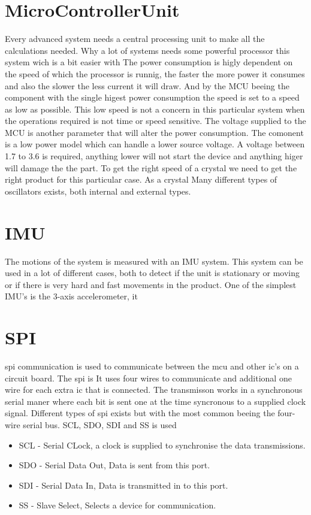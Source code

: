\section{MicroControllerUnit}
Every advanced system needs a central processing unit to make all the calculations needed. Why a lot of systems needs some powerful processor this system wich is a bit easier with 
The power consumption is higly dependent on the speed of which the processor is runnig, the faster the more power it consumes and also the slower the less current it will draw. And by the MCU beeing the component with the single higest power consumption the speed is set to a speed as low as possible. This low speed is not a concern in this particular system when the operations required is not time or speed sensitive. The voltage supplied to the MCU is another parameter that will alter the power consumption. The comonent is a low power model which can handle a lower source voltage. A voltage between 1.7 to 3.6 is required, anything lower will not start the device and anything higer will damage the the part. 
To get the right speed of a crystal we need to get the right product for this particular case. As a crystal 
Many different types of oscillators exists, both internal and external types. 

\section{IMU}
The motions of the system is measured with an IMU system. This system can be used in a lot of different cases, both to detect if the unit is stationary or moving or if there is very hard and fast movements in the product. One of the simplest IMU's is the 3-axis accelerometer, it

\section{SPI}
\gls{spi} communication is used to communicate between the \gls{mcu} and other \gls{ic}'s on a circuit board. The \gls{spi} is 
It uses four wires to communicate and additional one wire for each extra \gls{ic} that is connected. The transmisson works in a synchronous serial maner where each bit is sent one at the time syncronous to a supplied clock signal. Different types of \gls{spi} exists but with the most common beeing the four-wire serial bus. SCL, SDO, SDI and SS is used 

\begin{itemize}[noitemsep]
	\item SCL - Serial CLock, a clock is supplied to synchronise the data transmissions.
	\item SDO - Serial Data Out, Data is sent from this port.
	\item SDI - Serial Data In, Data is transmitted in to this port.
	\item SS - Slave Select, Selects a device for communication.
\end{itemize}

